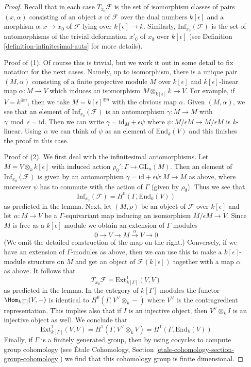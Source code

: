 \begin{proof}
Recall that in each case $T_{x_0}\mathcal{F}$ is the set of isomorphism
classes of pairs $(x, \alpha)$ consisting of an object $x$ of $\mathcal{F}
$ over the dual numbers $k[\epsilon]$ and a morphism
$\alpha : x \to x_0$ of $\mathcal{F}$ lying over $k[\epsilon] \to k$.
Similarly, $\text{Inf}_{x_0}(\mathcal{F})$ is the set of automorphisms
of the trivial deformation $x'_0$ of $x_0$ over $k[\epsilon]$ (see
Definition \ref{definition-infinitesimal-auts} for more details).

\medskip\noindent
Proof of (1). Of course this is trivial, but we work it out in some
detail to fix notation for the next cases. Namely, up to isomorphism,
there is a unique pair $(M, \alpha)$ consisting of a
finite projective module $M$ over $k[\epsilon]$
and $k[\epsilon]$-linear map $\alpha : M \to V$
which induces an isomorphism $M \otimes_{k[\epsilon]} k \to V$.
For example, if $V = k^{\oplus n}$, then we take
$M = k[\epsilon]^{\oplus n}$ with the obvious map $\alpha$.
Given $(M, \alpha)$, we see that an element of
$\text{Inf}_{x_0}(\mathcal{F})$ is an automorphism $\gamma : M \to M$ with
$\gamma \bmod \epsilon = \text{id}$. Then we can write
$\gamma = \text{id}_M + \epsilon \psi$ where
$\psi : M/\epsilon M \to M/\epsilon M$ is $k$-linear.
Using $\alpha$ we can think of $\psi$ as an element of
$\text{End}_k(V)$ and this finishes the proof in this case.

\medskip\noindent
Proof of (2). We first deal with the infinitesimal automorphisms.
Let $M = V \otimes_k k[\epsilon]$ with induced action
$\rho_0' : \Gamma \to \text{GL}_n(M)$.
Then an element of $\text{Inf}_{x_0}(\mathcal{F})$
is given by an automorphism
$\gamma = \text{id} + \epsilon \psi : M \to M$
as above, where moreover $\psi$ has to commute
with the action of $\Gamma$ (given by $\rho_0$).
Thus we see that
$$
\text{Inf}_{x_0}(\mathcal{F}) = H^0(\Gamma, \text{End}_k(V))
$$
as predicted in the lemma. Next, let $(M, \rho)$ be an object
of $\mathcal{F}$ over $k[\epsilon]$ and let
$\alpha : M \to V$ be a $\Gamma$-equivariant map
inducing an isomorphism $M/\epsilon M \to V$.
Since $M$ is free as a $k[\epsilon]$-module we obtain
an extension of $\Gamma$-modules
$$
0 \to V \to M \xrightarrow{\alpha} V \to 0
$$
(We omit the detailed construction of the map on the right.)
Conversely, if we have an extension of $\Gamma$-modules as
above, then we can use this to make a $k[\epsilon]$-module
structure on $M$ and get an object of $\mathcal{F}(k[\epsilon])$
together with a map $\alpha$ as above.
It follows that
$$
T_{x_0}\mathcal{F} = \text{Ext}^1_{k[\Gamma]}(V, V)
$$
as predicted in the lemma. In the category of $k[\Gamma]$-modules
the functor $\Hom_{k[\Gamma]}(V, -)$ is identical to
$H^0(\Gamma, V^\vee \otimes_k -)$ where $V^\vee$ is the contragredient
representation. This implies also that if $I$ is an injective object, then
$V^\vee \otimes_k I$ is an injective object as well. We conclude that
$$
\text{Ext}^1_{k[\Gamma]}(V, V) = H^1(\Gamma, V^\vee \otimes_k V) =
H^1(\Gamma, \text{End}_k(V))
$$
Finally, if $\Gamma$ is a finitely generated group, then by using
cocycles to compute group cohomology
(see \'Etale Cohomology, Section
\ref{etale-cohomology-section-group-cohomology})
we find that this cohomology group is finite dimensional.


\end{proof}
